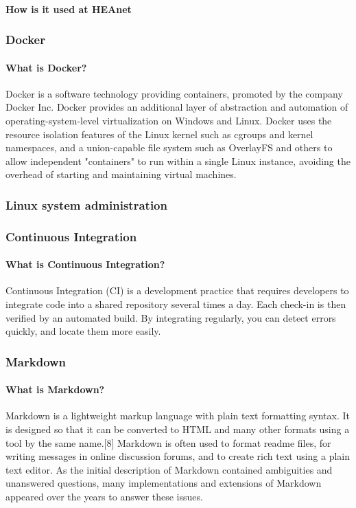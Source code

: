 \documentclass{article}
\begin{document}
	\paragraph{How is it used at HEAnet}
	\subsubsection{Docker}
	\paragraph{What is Docker?}
	Docker is a software technology providing containers, promoted by the company Docker Inc. Docker provides an additional layer of abstraction and automation of operating-system-level virtualization on Windows and Linux. Docker uses the resource isolation features of the Linux kernel such as cgroups and kernel namespaces, and a union-capable file system such as OverlayFS and others to allow independent "containers" to run within a single Linux instance, avoiding the overhead of starting and maintaining virtual machines.
	\subsubsection{Linux system administration}
	\subsubsection{Continuous Integration}
	\paragraph{What is Continuous Integration?}
	Continuous Integration (CI) is a development practice that requires developers to integrate code into a shared repository several times a day. Each check-in is then verified by an automated build. By integrating regularly, you can detect errors quickly, and locate them more easily.
	\subsubsection{Markdown}
	\paragraph{What is Markdown?}
	Markdown is a lightweight markup language with plain text formatting syntax. It is designed so that it can be converted to HTML and many other formats using a tool by the same name.[8] Markdown is often used to format readme files, for writing messages in online discussion forums, and to create rich text using a plain text editor. As the initial description of Markdown contained ambiguities and unanswered questions, many implementations and extensions of Markdown appeared over the years to answer these issues.
\end{document}

